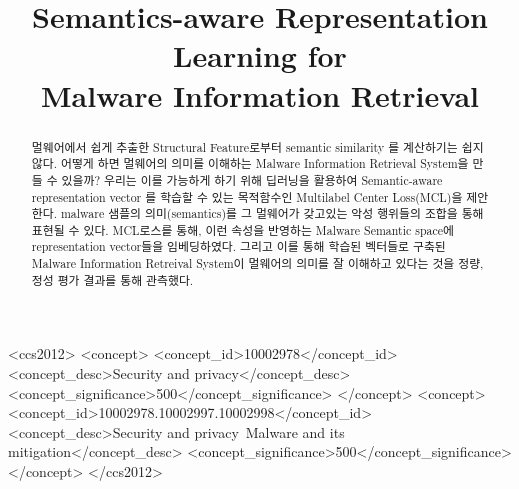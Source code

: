 \documentclass[sigconf, anonymous]{acmart}
\begin{document}
\title{Semantics-aware Representation Learning for \\
Malware Information Retrieval} %

\begin{abstract}
멀웨어에서 쉽게 추출한 Structural Feature로부터 semantic similarity 를 계산하기는 쉽지 않다. 어떻게 하면 멀웨어의 의미를 이해하는 Malware Information Retrieval System을 만들 수 있을까? 우리는 이를 가능하게 하기 위해 딥러닝을 활용하여 Semantic-aware representation vector 를 학습할 수 있는 목적함수인 Multilabel Center Loss(MCL)을 제안한다. malware 샘플의 의미(semantics)를 그 멀웨어가 갖고있는 악성 행위들의 조합을 통해 표현될 수 있다. MCL로스릍 통해, 이런 속성을 반영하는 Malware Semantic space에 representation vector들을 임베딩하였다. 그리고 이를 통해 학습된 벡터들로 구축된 Malware Information Retreival System이 멀웨어의 의미를 잘 이해하고 있다는 것을 정량, 정성 평가 결과를 통해 관측했다. 


\end{abstract}

\begin{CCSXML}
<ccs2012>
<concept>
<concept_id>10002978</concept_id>
<concept_desc>Security and privacy</concept_desc>
<concept_significance>500</concept_significance>
</concept>
<concept>
<concept_id>10002978.10002997.10002998</concept_id>
<concept_desc>Security and privacy~Malware and its mitigation</concept_desc>
<concept_significance>500</concept_significance>
</concept>
</ccs2012>
\end{CCSXML}



\maketitle




\end{document}
